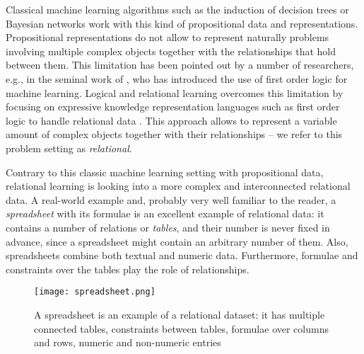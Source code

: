 Classical machine learning algorithms such as the induction of decision trees
\parencite{decision_trees} or Bayesian networks \parencite{pearl} work
with this kind of propositional data and representations.  Propositional representations do not allow to
represent naturally problems involving multiple complex objects
together with the relationships that hold between them. This limitation has been
pointed out by a number of researchers, e.g., in the seminal work of
\textcite{plotkin}, who has introduced  the use of first order logic
for machine learning. Logical and relational learning 
overcomes this limitation by focusing on expressive knowledge
representation languages such as first order logic to handle
relational data \parencite{luc_book}. This approach allows to represent a variable amount of complex objects together with their
relationships -- we refer to this problem setting as \textit{relational}.


Contrary to this classic machine learning setting with propositional
data, relational learning is looking into a more complex and
interconnected relational data. A real-world example and, probably
very well familiar to the reader, a \textit{spreadsheet} with its formulae is an
excellent example of relational data: it contains a number of
relations or \textit{tables}, and their number is never fixed in
advance, since a spreadsheet might contain an arbitrary number of
them. Also, spreadsheets combine both textual and numeric data. Furthermore,
formulae and constraints over the tables play the role of relationships.

\begin{figure}[thb]
  \begin{center}
    \texttt{[image: spreadsheet.png]}
  \end{center}
  \caption{A spreadsheet is an example of a relational dataset: it has multiple connected tables, constraints between tables, formulae over columns and rows, numeric and non-numeric entries}
  \label{fig:spreadsheet_example_intro}
\end{figure}

